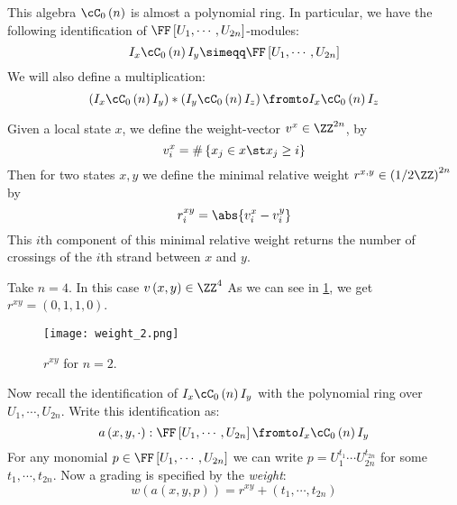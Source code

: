 \documentclass{amsproc}
\begin{document}
This algebra $\cC_0\left( n \right)$ is almost a polynomial ring.
In particular, we have the following identification of 
$\FF\left[ U_1 , \cdots , U_{2n} \right]$-modules:
\begin{equation}
I_x \cC_0\left( n \right) I_y
\simeqq \FF\left[ U_1 , \cdots , U_{2n} \right]
\end{equation}
We will also define a multiplication:
\begin{equation}
\left( I_x \cC_0\left( n \right) I_y\right) * 
\left( I_y \cC_0\left( n \right) I_z \right)
\fromto
I_x \cC_0\left( n \right) I_z
\end{equation}

Given a local state $x$, we define the weight-vector $v^x\in \ZZ^{2n}$, by 
\begin{equation}
v^x_i = \# \left\{ x_j \in x \st x_j \geq i\right\}
\end{equation}
Then for two states $x , y$ we define the minimal relative weight 
$r^{x,y}\in \left( 1/2 \ZZ \right)^{2n}$ by
\begin{equation}
r^{xy}_i = \abs{v_i^x - v_i^y}
\end{equation}
This $i$th component of this minimal relative weight 
returns the number of crossings of the $i$th strand between $x$ and $y$.

\begin{exm}
Take $n = 4$.
In this case $v\left( x , y \right) \in \ZZ^{4}$
As we can see in \cref{fig:weight_2}, 
we get $r^{xy} = \left( 0,1,1,0 \right)$.
\begin{figure}
\texttt{[image: weight\_2.png]}
\caption{$r^{xy}$ for $n = 2$.}
\label{fig:weight_2}
\end{figure}
\end{exm}

Now recall the identification of $I_x \cC_0\left( n \right) I_y$ with the polynomial ring
over $U_1 , \cdots , U_{2n}$. 
Write this identification as:
\begin{equation}
a\left( x , y , \cdot \right):
\FF\left[ U_1 , \cdots , U_{2n} \right] \fromto
I_x \cC_0\left( n \right) I_y
\end{equation}
For any monomial $p\in \FF\left[ U_1 , \cdots , U_{2n} \right]$ we can write
$p = U_1^{t_1} \cdots U_{2n}^{t_{2n}}$ for some $t_1 , \cdots , t_{2n}$.
Now a grading is specified by the \emph{weight}:
\begin{equation}
w\left( a\left( x , y , p \right) \right) = 
r^{xy} + \left( t_1 , \cdots , t_{2n} \right)
\end{equation}
\end{document}
